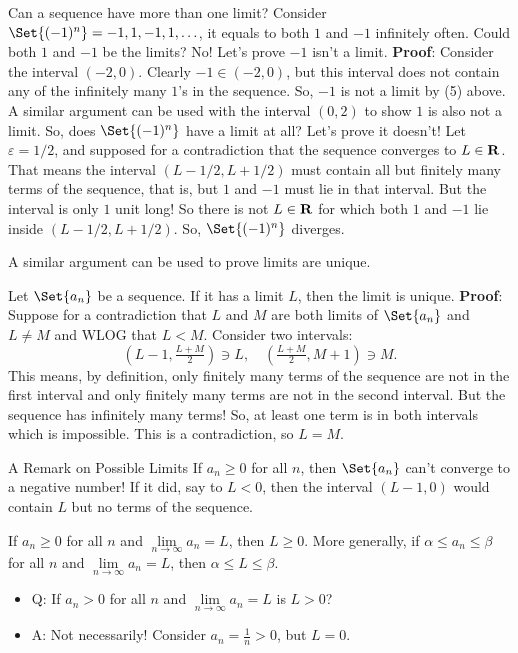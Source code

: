 \begin{Example}{}{}
    Can a sequence have more than one limit?
    Consider $ \Set{(-1)^n}=-1,1,-1,1,\ldots $, it equals to both $ 1 $ and $ -1 $ infinitely often. Could both $ 1 $ and $ -1 $
    be the limits? No! Let's prove $ -1 $ isn't a limit.
    \tcblower{}
    \textbf{Proof}: Consider the interval $ (-2,0) $. Clearly $ -1\in(-2,0) $, but
    this interval does not contain any of the infinitely many $ 1 $'s in the sequence. So, $ -1 $
    is not a limit by (5) above. A similar argument can be used with the interval $ (0,2) $ to show
    $ 1 $ is also not a limit. So, does $ \Set{(-1)^n} $ have a limit at all? Let's prove it doesn't!
    Let $ \varepsilon=1/2 $, and supposed for a contradiction that the sequence converges to $ L\in\mathbf{R} $. That means
    the interval $ (L-1/2,L+1/2) $ must contain all but finitely many terms of the sequence, that is, but $ 1 $ and $ -1 $
    must lie in that interval. But the interval is only $ 1 $ unit long! So there is not $ L\in\mathbf{R} $ for which both $ 1 $ and $ -1 $
    lie inside $ (L-1/2,L+1/2) $. So, $ \Set{(-1)^n} $ diverges.
\end{Example}
A similar argument can be used to prove limits are unique.
\begin{Theorem}{}{}
    Let $ \Set{a_n} $ be a sequence. If it has a limit $ L $, then the limit is unique.
    \tcblower{}
    \textbf{Proof}: Suppose for a contradiction that $ L $ and $ M $
    are both limits of $ \Set{a_n} $ and $ L\ne M $ and WLOG that $ L<M $. Consider two intervals:
    \[ (L-1,\tfrac{L+M}{2})\ni L,\quad (\tfrac{L+M}{2},M+1)\ni M. \]
    This means, by definition, only finitely many terms of the sequence are not in the first interval and only finitely
    many terms are not in the second interval. But the sequence has infinitely many terms! So, at least one term is in both intervals
    which is impossible. This is a contradiction, so $ L=M $.
\end{Theorem}
\begin{Remark}{A Remark on Possible Limits}{}
    If $ a_n\ge 0 $ for all $ n $, then $ \Set{a_n} $ can't converge to a negative number! If it did, say to $ L<0 $,
    then the interval $ (L-1,0) $ would contain $ L $ but no terms of the sequence.
\end{Remark}
\begin{Theorem}{}{}
    If $ a_n\ge 0 $ for all $ n $ and $ \lim\limits_{{n} \to {\infty}}a_n=L $, then $ L\ge 0 $.
    More generally, if $ \alpha\le a_n\le \beta $ for all $ n $ and $ \lim\limits_{{n} \to {\infty}}a_n=L $,
    then $ \alpha\le L\le \beta $.
\end{Theorem}
\begin{itemize}
    \item Q: If $ a_n>0 $ for all $ n $ and $ \lim\limits_{{n} \to {\infty}}a_n=L $ is $ L>0 $?
    \item A: Not necessarily! Consider $ a_n=\frac{1}{n}>0 $, but $ L=0 $.
\end{itemize}
